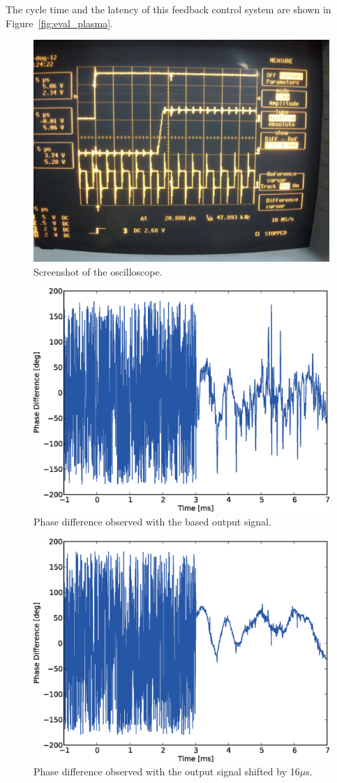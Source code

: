 The cycle time and the latency of this feedback control system are shown
in Figure~\ref{fig:eval_plasma}.

\begin{figure}[t]
 \centering
 \includegraphics[width=0.85\hsize]{eps/oscilloscope.eps}
 \caption{Screenshot of the oscilloscope.}
 \label{fig:oscilloscope}
\end{figure}

\begin{figure}[t]
 \centering
 \includegraphics[width=0.7\hsize]{eps/75221_base.eps}
 \caption{Phase difference observed with the based output signal.}
 \label{fig:phase_base}
\end{figure}

\begin{figure}[t]
 \centering
 \includegraphics[width=0.7\hsize]{eps/75221_shifted.eps}
 \caption{Phase difference observed with the output signal shifted by 16$\mu$s.}
 \label{fig:phase_shifted}
\end{figure}

